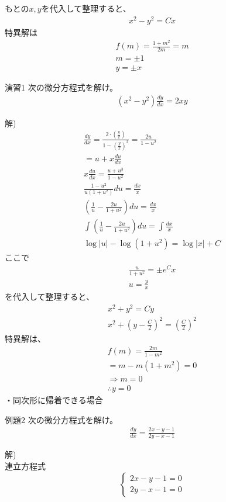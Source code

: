 \documentclass{jsarticle}
\begin{document}
もとの$x,y$を代入して整理すると、
\begin{eqnarray}
x^2-y^2=Cx
\end{eqnarray}
特異解は
\begin{eqnarray}
f(m)=\frac{1+m^2}{2m}=m\\
m=\pm 1\\
y= \pm x
\end{eqnarray}
\begin{itembox}[l]{演習1}
次の微分方程式を解け。
\begin{eqnarray}
(x^2-y^2)\frac{dy}{dx}=2xy
\end{eqnarray}
\end{itembox}
解)
\begin{eqnarray}
\frac{dy}{dx}=\frac{2\cdot\left(\frac{y}{x}\right)}{1-\left(\frac{y}{x}\right)^2}=\frac{2u}{1-u^2}\\
=u+x\frac{du}{dx}\\
x\frac{du}{dx}=\frac{u+u^3}{1-u^2}\\
\frac{1-u^2}{u(1+u^2)}du=\frac{dx}{x}\\
\left(\frac{1}{u}-\frac{2u}{1+u^2}\right)du=\frac{dx}{x}\\
\int \left(\frac{1}{u}-\frac{2u}{1+u^2}\right)du=\int \frac{dx}{x}\\
\log |u|-\log(1+u^2) = \log|x| +C
\end{eqnarray}
ここで
\begin{eqnarray}
\frac{u}{1+u^2}=\pm e^Cx\\
u=\frac{y}{x}
\end{eqnarray}
を代入して整理すると、
\begin{eqnarray}
x^2+y^2=Cy\\
x^2+\left(y-\frac{C}{2}\right)^2=\left(\frac{C}{2}\right)^2
\end{eqnarray}
特異解は、
\begin{eqnarray}
f(m)=\frac{2m}{1-m^2}\\
=m-m(1+m^2)=0\\
\Rightarrow m=0\\
\therefore y=0
\end{eqnarray}
・同次形に帰着できる場合
\begin{itembox}[l]{例題2}
次の微分方程式を解け。
\begin{eqnarray}
\frac{dy}{dx}=\frac{2x-y-1}{2y-x-1}
\end{eqnarray}
\end{itembox}
解)\\
連立方程式
\begin{displaymath}
\left\{
\begin{array}{l}
2x-y-1=0 \\
2y-x-1=0
\end{array}
\right.
\end{displaymath}
\end{document}
